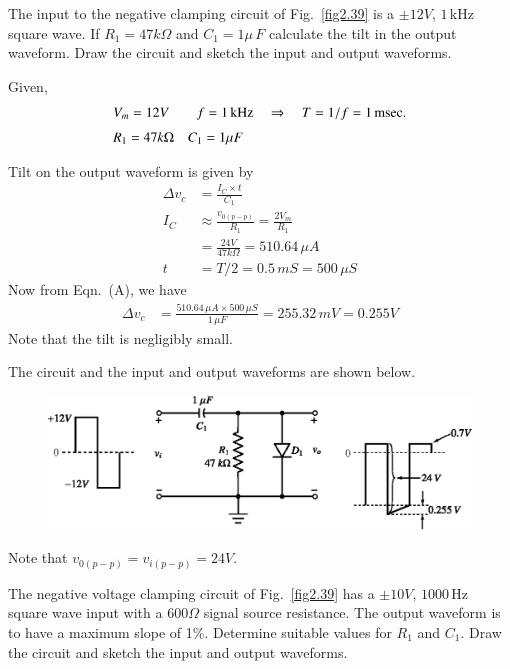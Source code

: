 \begin{example}\label{exam2.48}
The input to the negative clamping circuit of Fig.~\ref{fig2.39} is a $\pm 12V$, $1$\,kHz square wave. If $R_{1}=47k\Omega$ and $C_{1}=1\mu\, F$ calculate the tilt in the output waveform. Draw the circuit and sketch the input and output waveforms.
\end{example}

\begin{solution}
Given,
\begin{align*}
& V_{m}=12V\qquad f=1\text{\,kHz}\quad\Rightarrow\quad T=1/f=1\text{\,msec.}\\[3pt]
& R_{1}=47k\Omega\quad C_{1}=1\mu F
\end{align*}

Tilt on the output waveform is given by
\begin{align*}
\Delta v_{c} &= \frac{I_{C}\times t}{C_{1}}\tag{A}\\[3pt]
I_{C} &\approx \frac{v_{0(p-p)}}{R_{1}}=\frac{2V_{m}}{R_{1}}\\[3pt]
&= \frac{24V}{47k\Omega}=510.64\,\mu A\\[3pt]
t &= T/2=0.5\,mS=500\,\mu S
\end{align*}
Now from Eqn.~(A), we have
\begin{align*}
\Delta v_{c} &= \frac{510.64\,\mu A\times 500\, \mu S}{1\,\mu F}= 255.32\,mV=0.255V
\end{align*}
Note that the tilt is negligibly small.

The circuit and the input and output waveforms are shown below.
\begin{figure}[H]
\centering
\includegraphics{chap2/sol2.48a.eps}
\end{figure}
Note that $v_{0(p-p)}=v_{i(p-p)}=24V$.
\end{solution}

\vfill\eject

\begin{example}\label{exam2.49}
The negative voltage clamping circuit of Fig.~\ref{fig2.39} has a $\pm 10V$, $1000$\,Hz square wave input with a $600\Omega$ signal source resistance. The output waveform is to have a maximum slope of 1\%. Determine suitable values for $R_{1}$ and $C_{1}$. Draw the circuit and sketch the input and output waveforms.
\end{example}

